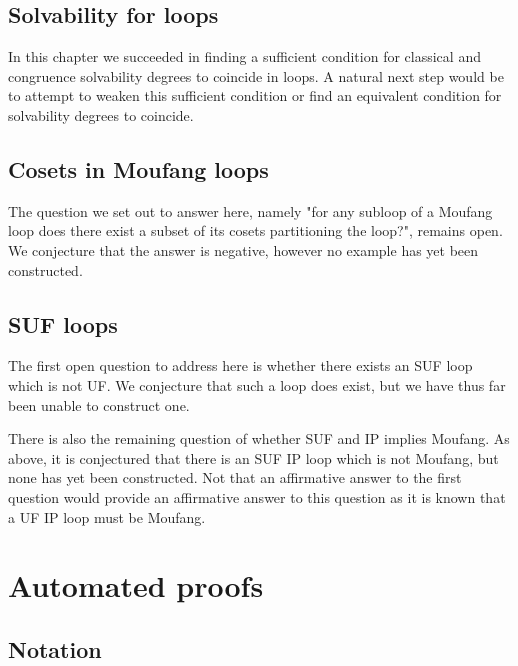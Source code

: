 \documentclass[12pt, twoside, openright]{report}
\theoremstyle{definition}
\begin{document}
\section{Solvability for loops}

In this chapter we succeeded in finding a sufficient condition for classical and congruence solvability
  degrees to coincide in loops. A natural next step would be to attempt to weaken this sufficient
  condition or find an equivalent condition for solvability degrees to coincide.

\section{Cosets in Moufang loops}

The question we set out to answer here, namely "for any subloop of a Moufang loop does there exist a
  subset of its cosets partitioning the loop?", remains open. We conjecture that the answer is negative,
  however no example has yet been constructed.

\section{SUF loops}

The first open question to address here is whether there exists an SUF loop which is not UF. We conjecture
  that such a loop does exist, but we have thus far been unable to construct one.

There is also the remaining question of whether SUF and IP implies Moufang. As above, it is conjectured that
  there is an SUF IP loop which is not Moufang, but none has yet been constructed. Not that an affirmative
  answer to the first question would provide an affirmative answer to this question as it is known
  \cite{SUF} that a UF IP loop must be Moufang.






\appendix

\chapter{Automated proofs}

\section{Notation}
\end{document}
